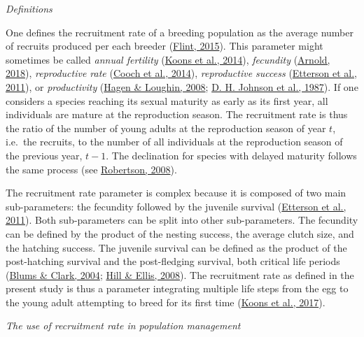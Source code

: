 \documentclass[
  english,
]{article}
\begin{document}
\emph{Definitions}

One defines the recruitment rate of a breeding population as the average number of recruits produced per each breeder (\protect\hyperlink{ref-Flint2015}{Flint, 2015}). This parameter might sometimes be called \emph{annual fertility} (\protect\hyperlink{ref-Koons2014}{Koons et al., 2014}), \emph{fecundity} (\protect\hyperlink{ref-Arnold2018}{Arnold, 2018}), \emph{reproductive rate} (\protect\hyperlink{ref-Cooch2014}{Cooch et al., 2014}), \emph{reproductive success} (\protect\hyperlink{ref-Etterson2011}{Etterson et al., 2011}), or \emph{productivity} (\protect\hyperlink{ref-Hagen2008}{Hagen \& Loughin, 2008}; \protect\hyperlink{ref-Johnson1987}{D. H. Johnson et al., 1987}). If one considers a species reaching its sexual maturity as early as its first year, all individuals are mature at the reproduction season. The recruitment rate is thus the ratio of the number of young adults at the reproduction season of year \(t\), i.e.~the recruits, to the number of all individuals at the reproduction season of the previous year, \(t - 1\). The declination for species with delayed maturity follows the same process (see \protect\hyperlink{ref-Robertson2008}{Robertson, 2008}).

The recruitment rate parameter is complex because it is composed of two main sub-parameters: the fecundity followed by the juvenile survival (\protect\hyperlink{ref-Etterson2011}{Etterson et al., 2011}). Both sub-parameters can be split into other sub-parameters. The fecundity can be defined by the product of the nesting success, the average clutch size, and the hatching success. The juvenile survival can be defined as the product of the post-hatching survival and the post-fledging survival, both critical life periods (\protect\hyperlink{ref-Blums2004}{Blums \& Clark, 2004}; \protect\hyperlink{ref-Hill2008}{Hill \& Ellis, 2008}). The recruitment rate as defined in the present study is thus a parameter integrating multiple life steps from the egg to the young adult attempting to breed for its first time (\protect\hyperlink{ref-Koons2017}{Koons et al., 2017}).

\emph{The use of recruitment rate in population management}
\end{document}
